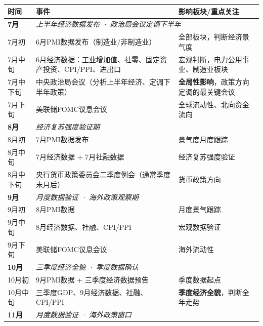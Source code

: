 \begin{exhibitbox}[表9-31：2026年下半年宏观政策与经济数据日历]
\scriptsize
\setlength{\tabcolsep}{3pt}
\renewcommand{\arraystretch}{1.12}
\begin{tabularx}{\textwidth}{l X l}
\toprule
\textbf{时间} & \textbf{事件} & \textbf{影响板块/重点关注} \\
\midrule
\rowcolor{navy!5}
\textbf{7月} & \multicolumn{2}{l}{\textit{上半年经济数据发布 · 政治局会议定调下半年}} \\
\rowcolor{navy!5}
7月初 & 6月PMI数据发布（制造业/非制造业） & 全部板块，判断经济景气度 \\
\rowcolor{navy!5}
7月中旬 & 6月经济数据：工业增加值、社零、固定资产投资、CPI/PPI、进出口 & 宏观判断，电力公用事业、制造业板块 \\
\rowcolor{navy!5}
7月中下旬 & 中央政治局会议（分析上半年经济、定调下半年政策） & \textbf{全局性影响}，政策方向定调的最关键会议 \\
\rowcolor{navy!5}
7月下旬 & 美联储FOMC议息会议 & 全球流动性、北向资金流向 \\
\midrule
\rowcolor{accentblue!5}
\textbf{8月} & \multicolumn{2}{l}{\textit{经济复苏强度验证期}} \\
\rowcolor{accentblue!5}
8月初 & 7月PMI数据发布 & 景气度月度跟踪 \\
\rowcolor{accentblue!5}
8月中旬 & 7月经济数据 + 7月社融数据 & 经济复苏强度验证 \\
\rowcolor{accentblue!5}
8月中下旬 & 央行货币政策委员会二季度例会（通常季度末月后） & 货币政策方向 \\
\midrule
\rowcolor{riskgreen!5}
\textbf{9月} & \multicolumn{2}{l}{\textit{月度数据验证 · 海外政策观察期}} \\
\rowcolor{riskgreen!5}
9月初 & 8月PMI数据 & 月度景气跟踪 \\
\rowcolor{riskgreen!5}
9月中旬 & 8月经济数据、社融、CPI/PPI & 宏观数据验证 \\
\rowcolor{riskgreen!5}
9月下旬 & 美联储FOMC议息会议 & 海外流动性 \\
\midrule
\rowcolor{riskamber!5}
\textbf{10月} & \multicolumn{2}{l}{\textit{三季度经济全貌 · 季度数据确认}} \\
\rowcolor{riskamber!5}
10月初 & 9月PMI数据 + 三季度经济数据预告 & 季度数据起点 \\
\rowcolor{riskamber!5}
10月中旬 & 三季度GDP、9月经济数据、社融、CPI/PPI & \textbf{季度经济全貌}，判断全年走势 \\
\midrule
\rowcolor{riskred!5}
\textbf{11月} & \multicolumn{2}{l}{\textit{月度数据验证 · 海外政策窗口}} \\

\end{tabularx}
\end{exhibitbox}
